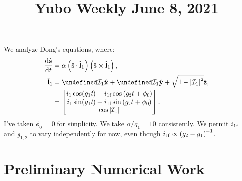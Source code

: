 \documentclass[11pt,
        usenames, %
        dvipsnames %
    ]{article}
\newcommand*{\rd}[2]{\frac{\mathrm{d}#1}{\mathrm{d}#2}}
\newcommand*{\bm}[1]{\boldsymbol{\mathbf{#1}}}
\newcommand*{\uv}[1]{\hat{\bm{#1}}}
\newcommand*{\abs}[1]{\left|#1\right|}
\newcommand*{\p}[1]{\left(#1\right)}
\let\Re\undefined
\let\Im\undefined
\DeclareMathOperator{\Re}{Re}
\DeclareMathOperator{\Im}{Im}
\begin{document}
\onehalfspacing

\pagestyle{fancy}
\rhead{}
\cfoot{\thepage/\pageref{LastPage}}

\title{Yubo Weekly June 8, 2021}

\maketitle

We analyze Dong's equations, where:
\begin{align}
    \rd{\uv{s}}{t} &= \alpha\p{\uv{s} \cdot \uv{l}_1}\p{\uv{s} \times
        \uv{l}_1},\\
    \uv{l}_1 &= \Re \mathcal{I}_1\uv{x}
            + \Im \mathcal{I}_1 \uv{y}
            + \sqrt{1 - \abs{\mathcal{I}_1}^2}
            \uv{z},\label{eq:06/02/21.l1param}\\
        &= \begin{bmatrix}
            i_1 \cos (g_1t) + i_{\rm 1f} \cos\p{g_2 t + \phi_0}\\
            i_1 \sin (g_1t) + i_{\rm 1f} \sin\p{g_2 t + \phi_0}\\
            \cos\abs{\mathcal{I}_1}
        \end{bmatrix}.
\end{align}
I've taken $\phi_0 = 0$ for simplicity. We take $\alpha / g_1 = 10$
consistently. We permit $i_{\rm 1f}$ and $g_{1,2}$ to vary independently for
now, even though $i_{\rm 1f} \propto \p{g_2 - g_1}^{-1}$.

\section{Preliminary Numerical Work}
\end{document}
